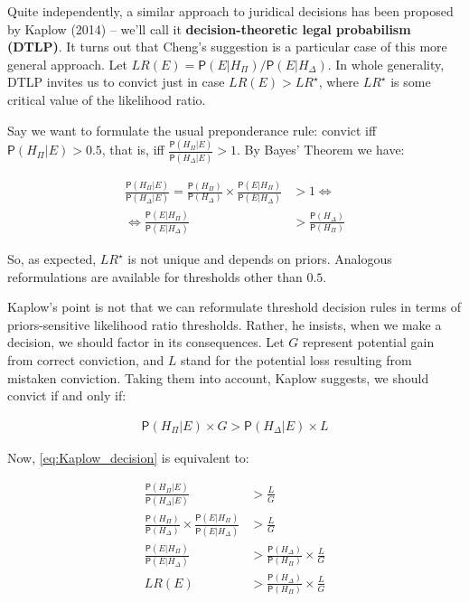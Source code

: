 \documentclass[10pt,dvipsnames,enabledeprecatedfontcommands]{scrartcl}
\newcommand{\pr}[1]{\mathsf{P}(#1)}
\begin{document}
Quite independently, a similar approach to juridical decisions has been
proposed by Kaplow (2014) -- we'll call it
\textbf{decision-theoretic legal probabilism (DTLP)}. It turns out that
Cheng's suggestion is a particular case of this more general approach.
Let \(LR(E)=\pr{E\vert H_\Pi}/\pr{E\vert H_\Delta}\). In whole
generality, DTLP invites us to convict just in case \(LR(E)>LR^\star\),
where \(LR^\star\) is some critical value of the likelihood ratio.

Say we want to formulate the usual preponderance rule: convict iff
\(\pr{H_\Pi\vert E}>0.5\), that is, iff
\(\frac{\pr{H_\Pi\vert E}}{\pr{H_\Delta\vert E}}>1\). By Bayes' Theorem
we have:

\vspace{-6mm}

\begin{align*}
\frac{\pr{H_\Pi\vert E}}{\pr{H_\Delta\vert E}} =  \frac{\pr{H_\Pi}}{\pr{H_\Delta}}\times \frac{\pr{E\vert H_\Pi}}{\pr{E\vert H_\Delta}} &>1 \Leftrightarrow\\
  \Leftrightarrow \frac{\pr{E\vert H_\Pi}}{\pr{E\vert H_\Delta}} &> \frac{\pr{H_\Delta}}{\pr{H_\Pi}} 
 \end{align*}

\noindent So, as expected, \(LR^\star\) is not unique and depends on
priors. Analogous reformulations are available for thresholds other than
\(0.5\).

Kaplow's point is not that we can reformulate threshold decision rules
in terms of priors-sensitive likelihood ratio thresholds. Rather, he
insists, when we make a decision, we should factor in its consequences.
Let \(G\) represent potential gain from correct conviction, and \(L\)
stand for the potential loss resulting from mistaken conviction. Taking
them into account, Kaplow suggests, we should convict if and only if:

\vspace{-6mm}

\begin{align}
\label{eq:Kaplow_decision}
\pr{H_\Pi\vert E}\times G > \pr{H_\Delta\vert E}\times L
\end{align}

\noindent Now, \eqref{eq:Kaplow_decision} is equivalent to:

\vspace{-6mm}

\begin{align}
\nonumber
\frac{\pr{H_\Pi \vert E}}{\pr{H_\Delta \vert E}} & > \frac{L}{G}\\
\nonumber
\frac{\pr{H_\Pi}}{\pr{H_\Delta}} \times \frac{\pr{E\vert H_\Pi}}{\pr{E\vert H_\Delta}} &> \frac{L}{G}\\
\nonumber
\frac{\pr{E\vert H_\Pi}}{\pr{E\vert H_\Delta}}  & > \frac{\pr{H_\Delta}}{\pr{H_\Pi}} \times \frac{L}{G}\\
\label{eq:Kaplow_decision2} LR(E)  & > \frac{\pr{H_\Delta}}{\pr{H_\Pi}} \times \frac{L}{G}
\end{align}
\end{document}
